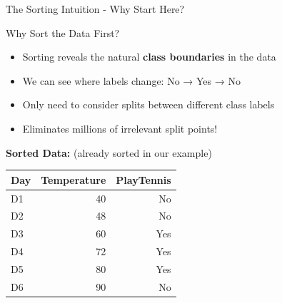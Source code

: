 \documentclass[usenames,dvipsnames]{beamer}
\begin{document}
\begin{frame}{The Sorting Intuition - Why Start Here?}
\begin{examplebox}{Why Sort the Data First?}
    \scriptsize

\begin{itemize}
\item Sorting reveals the natural \textbf{class boundaries} in the data
\item We can see where labels change: No → Yes → No
\item Only need to consider splits between different class labels
\item Eliminates millions of irrelevant split points!
\end{itemize}
\end{examplebox}

\textbf{Sorted Data:} (already sorted in our example)
\begin{table}[]
    \scriptsize

	\begin{tabular}{@{}lrr@{}}
		\toprule
		\textbf{Day} & \textbf{Temperature} & \textbf{PlayTennis} \\ \midrule
		D1           & 40                   & No                  \\
		D2           & 48                   & No                  \\
		D3           & 60                   & Yes                 \\
		D4           & 72                   & Yes                 \\
		D5           & 80                   & Yes                 \\
		D6           & 90                   & No                  \\ \bottomrule
	\end{tabular}
\end{table}
\end{frame}
\end{document}
